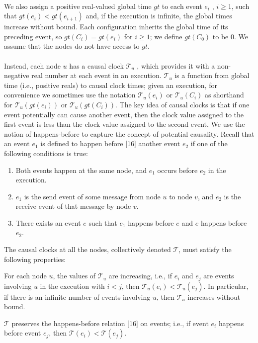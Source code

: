 \paragraph{}We also assign a positive real-valued global time $gt$ to each event $e_i$ , $i \geq 1$, such that $gt(e_i) < gt(e_{i+1})$ and, if the execution is infinite, the global times increase without bound. Each configuration inherits the global time of its preceding event, so $gt(C_i) = gt(e_i)$ for $i \geq 1$; we define $gt(C_0)$ to be $0$. We assume that the nodes do not have access to $gt$.
\paragraph{}Instead, each node $u$ has a causal clock $\mathcal{T}_u$ , which provides it with a non-negative real number at each event in an execution. $\mathcal{T}_u$ is a function from global time (i.e., positive reals) to causal clock times; given an execution, for convenience we sometimes use the notation $\mathcal{T}_u(e_i)$ or $\mathcal{T}_u(C_i)$ as shorthand for $\mathcal{T}_u(gt(e_i))$ or $\mathcal{T}_u(gt(C_i))$. The key idea of causal clocks is that if one event potentially can cause another event, then the clock value assigned to the first event is less than the clock value assigned to the second event. We use the notion of happens-before to capture the concept of potential causality. Recall that an event $e_1$ is defined to happen before [16] another event $e_2$ if one of the following conditions is true:
\begin{enumerate}
	\item Both events happen at the same node, and $e_1$ occurs before $e_2$ in the execution.
	\item $e_1$ is the send event of some message from node $u$ to node $v$, and $e_2$ is the receive event of that message by node $v$.
	\item There exists an event $e$ such that $e_1$ happens before $e$ and $e$ happens before $e_2$.
\end{enumerate}
The causal clocks at all the nodes, collectively denoted $\mathcal{T}$, must satisfy the following properties:
\begin{list}{--}{}
	\item For each node $u$, the values of $\mathcal{T}_u$ are increasing, i.e., if $e_i$ and $e_j$ are events involving $u$ in the execution with $i < j$, then $\mathcal{T}_u(e_i) < \mathcal{T}_u(e_j)$. In particular, if there is an infinite number of events involving $u$, then $\mathcal{T}_u$ increases without bound.
	\item $\mathcal{T}$ preserves the happens-before relation [16] on events; i.e., if event $e_i$ happens before event $e_j$, then $\mathcal{T}(e_i) < \mathcal{T}(e_j)$.
\end{list}

